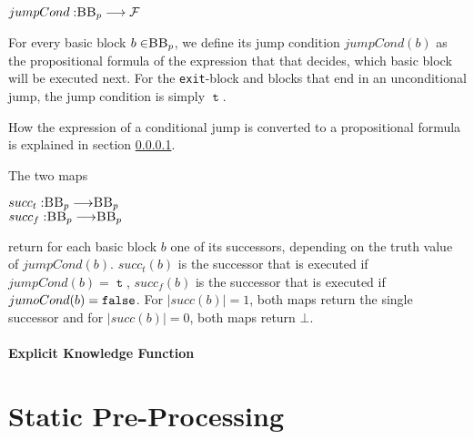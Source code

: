 \begin{definition}
    \begin{center}
        $jumpCond: \mbb_p \longrightarrow \mbform$
    \end{center}
    For every basic block $b \in \mbb_p$, we define its jump condition $jumpCond(b)$ as the propositional formula of the expression that that decides, which basic block will be executed next. For the \texttt{exit}-block and blocks that end in an unconditional jump, the jump condition is simply $\mttt$.

    How the expression of a conditional jump is converted to a propositional formula is explained in section \ref{sec:prop}.
\end{definition}

\begin{definition}
    The two maps
    \begin{center}
        $succ_t : \mbb_p \longrightarrow \mbb_p$\\
        $succ_f : \mbb_p \longrightarrow \mbb_p$\\
    \end{center}
    return for each basic block $b$ one of its successors, depending on the truth value of $jumpCond(b)$. $succ_t(b)$ is the successor that is executed if $jumpCond(b) = \mttt$, $succ_f(b)$ is the successor that is executed if $jumoCond(b) = \mathtt{false}$. For $|succ(b)| = 1$, both maps return the single successor and for $|succ(b)| = 0$, both maps return $\bot$.
\end{definition}

\begin{definition}
    
\end{definition}


\paragraph{Explicit Knowledge Function}\label{sec:prop}


\section{Static Pre-Processing}

